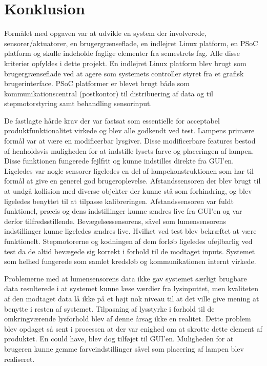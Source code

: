 \chapter{Konklusion}

Formålet med opgaven var at udvikle en system der involverede, sensorer/aktuatorer, en brugergrænseflade, en indlejret Linux platform, en PSoC platform og skulle indeholde faglige elementer fra semestrets fag. Alle disse kriterier opfyldes i dette projekt. En indlejret Linux platform blev brugt som brugergrænseflade ved at agere som systemets controller styret fra et grafisk brugerinterface. PSoC platformer er blevet brugt både som kommunikationscentral (postkontor) til distribuering af data og til stepmotorstyring samt behandling sensorinput.


De fastlagte hårde krav der var fastsat som essentielle for acceptabel produktfunktionalitet virkede og blev alle godkendt ved test. Lampens primære formål var at være en modificerbar lysgiver. Disse modificerbare features bestod af henholdsvis muligheden for at indstille lysets farve og placeringen af lampen. Disse funktionen fungerede fejlfrit og kunne indstilles direkte fra GUI’en. Ligeledes var nogle sensorer ligeledes en del af lampekonstruktionen som har til formål at give en generel god brugeroplevelse. Afstandssensoren der blev brugt til at undgå kollision med diverse objekter der kunne stå som forhindring, og blev ligeledes benyttet til at tilpasse kalibreringen. Afstandssensoren var fuldt funktionel, præcis og dens indstillinger kunne ændres live fra GUI’en og var derfor tilfredsstillende. Bevægelsessensorens, såvel som lumensensorens indstillinger kunne ligeledes ændres live. Hvilket ved test blev bekræftet at være funktionelt. Stepmotorerne og kodningen af dem forløb ligeledes ufejlbarlig ved test da de altid bevægede sig korrekt i forhold til de modtaget inputs. Systemet som helhed fungerede som samlet kredsløb og kommunikationen internt virkede.


Problemerne med at lumensensorens data ikke gav systemet særligt brugbare data resulterede i at systemet kunne læse værdier fra lysinputtet, men kvaliteten af den modtaget data lå ikke på et højt nok niveau til at det ville give mening at benytte i resten af systemet. Tilpasning af lysstyrke i forhold til de omkringværende lysforhold blev af denne årsag ikke en realitet. Dette problem blev opdaget så sent i processen at der var enighed om at skrotte dette element af produktet.
En could have, blev dog tilføjet til GUI’en. Muligheden for at brugeren kunne gemme farveindstillinger såvel som placering af lampen blev realiseret. 